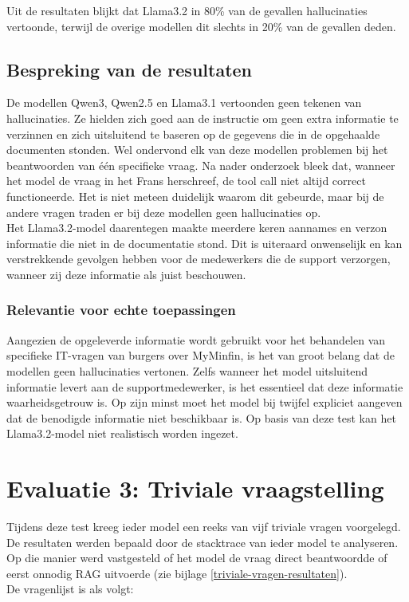Uit de resultaten blijkt dat Llama3.2 in 80\% van de gevallen hallucinaties vertoonde, terwijl de overige modellen dit slechts in 20\% van de gevallen deden.

\subsection{Bespreking van de resultaten}

De modellen Qwen3, Qwen2.5 en Llama3.1 vertoonden geen tekenen van hallucinaties. Ze hielden zich goed aan de instructie om geen extra informatie te verzinnen en zich uitsluitend te baseren op de gegevens die in de opgehaalde documenten stonden. Wel ondervond elk van deze modellen problemen bij het beantwoorden van één specifieke vraag. Na nader onderzoek bleek dat, wanneer het model de vraag in het Frans herschreef, de tool call niet altijd correct functioneerde. Het is niet meteen duidelijk waarom dit gebeurde, maar bij de andere vragen traden er bij deze modellen geen hallucinaties op.
\\[1em]
Het Llama3.2-model daarentegen maakte meerdere keren aannames en verzon informatie die niet in de documentatie stond. Dit is uiteraard onwenselijk en kan verstrekkende gevolgen hebben voor de medewerkers die de support verzorgen, wanneer zij deze informatie als juist beschouwen.

\subsubsection{Relevantie voor echte toepassingen}

Aangezien de opgeleverde informatie wordt gebruikt voor het behandelen van specifieke IT-vragen van burgers over MyMinfin, is het van groot belang dat de modellen geen hallucinaties vertonen. Zelfs wanneer het model uitsluitend informatie levert aan de supportmedewerker, is het essentieel dat deze informatie waarheidsgetrouw is. Op zijn minst moet het model bij twijfel expliciet aangeven dat de benodigde informatie niet beschikbaar is. Op basis van deze test kan het Llama3.2-model niet realistisch worden ingezet.

\section{Evaluatie 3: Triviale vraagstelling}

Tijdens deze test kreeg ieder model een reeks van vijf triviale vragen voorgelegd. De resultaten werden bepaald door de stacktrace van ieder model te analyseren. Op die manier werd vastgesteld of het model de vraag direct beantwoordde of eerst onnodig RAG uitvoerde (zie bijlage \ref{triviale-vragen-resultaten}).
\\[1em]
De vragenlijst is als volgt:

